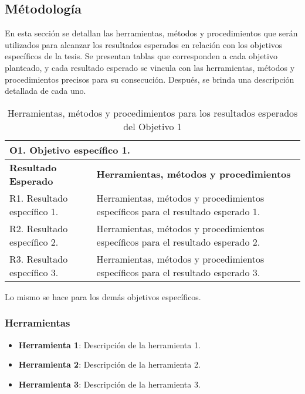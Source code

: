 
\subsection{Métodología}
\label{subsec:metodologia}

En esta sección se detallan las herramientas, métodos y procedimientos que serán utilizados para alcanzar los
resultados esperados en relación con los objetivos específicos de la tesis. Se presentan tablas que corresponden
a cada objetivo planteado, y cada resultado esperado se vincula con las herramientas, métodos y procedimientos precisos
para su consecución. Después, se brinda una descripción detallada de cada uno.

\begin{table}[h!]
    \centering
    {\footnotesize
        \begin{tabular}{|p{6.5cm}|p{8.5cm}|}
            \hline
            \multicolumn{2}{|p{15cm}|}{\textbf{O1. Objetivo específico 1.}}                                                \\
            \hline
            \textbf{Resultado Esperado} & \textbf{Herramientas, métodos y procedimientos}                                  \\
            \hline
            R1. Resultado específico 1. & Herramientas, métodos y procedimientos específicos para el resultado esperado 1. \\
            \hline
            R2. Resultado específico 2. & Herramientas, métodos y procedimientos específicos para el resultado esperado 2. \\
            \hline
            R3. Resultado específico 3. & Herramientas, métodos y procedimientos específicos para el resultado esperado 3. \\
            \hline
        \end{tabular}
    }
    \caption{Herramientas, métodos y procedimientos para los resultados esperados del Objetivo 1}
    \label{tab:herramientas_objetivo_1}

\end{table}

Lo mismo se hace para los demás objetivos específicos.

\subsubsection{Herramientas}
\label{subsubsec:metodologia_herramientas}

\begin{itemize}
    \item \textbf{Herramienta 1}: Descripción de la herramienta 1.
    \item \textbf{Herramienta 2}: Descripción de la herramienta 2.
    \item \textbf{Herramienta 3}: Descripción de la herramienta 3.
\end{itemize}

